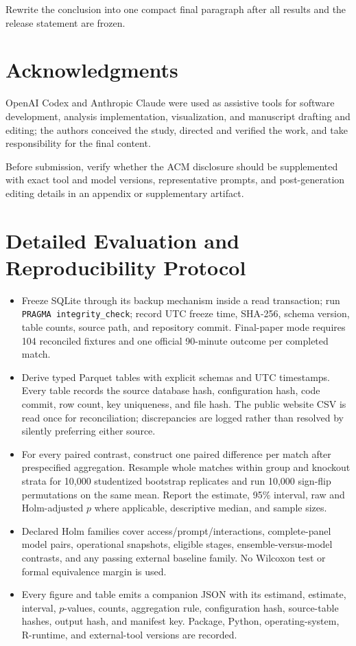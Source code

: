 \documentclass[sigconf,review]{acmart}
\newenvironment{draftbullets}
  {\begin{itemize}[leftmargin=1.25em,itemsep=1.5pt,topsep=2pt,parsep=0pt,partopsep=0pt]}
  {\end{itemize}}
\newcommand{\TODO}[1]{{\color{red}#1}}
\begin{document}
\TODO{Rewrite the conclusion into one compact final paragraph after all results and the release statement are frozen.}

\section*{Acknowledgments}

OpenAI Codex and Anthropic Claude were used as assistive tools for software development, analysis
implementation, visualization, and manuscript drafting and editing; the authors conceived the study,
directed and verified the work, and take responsibility for the final content.

\TODO{Before submission, verify whether the ACM disclosure should be supplemented with exact tool and model versions, representative prompts, and post-generation editing details in an appendix or supplementary artifact.}




\clearpage
\appendix

\section{Detailed Evaluation and Reproducibility Protocol}

\begin{draftbullets}
  \item Freeze SQLite through its backup mechanism inside a read transaction; run
  \texttt{PRAGMA integrity\_check}; record UTC freeze time, SHA-256, schema version, table counts,
  source path, and repository commit. Final-paper mode requires 104 reconciled fixtures and one
  official 90-minute outcome per completed match.
  \item Derive typed Parquet tables with explicit schemas and UTC timestamps. Every table records the
  source database hash, configuration hash, code commit, row count, key uniqueness, and file hash.
  The public website CSV is read once for reconciliation; discrepancies are logged rather than
  resolved by silently preferring either source.
  \item For every paired contrast, construct one paired difference per match after prespecified
  aggregation. Resample whole matches within group and knockout strata for 10,000 studentized
  bootstrap replicates and run 10,000 sign-flip permutations on the same mean. Report the estimate,
  95\% interval, raw and Holm-adjusted $p$ where applicable, descriptive median, and sample sizes.
  \item Declared Holm families cover access/prompt/interactions, complete-panel model pairs,
  operational snapshots, eligible stages, ensemble-versus-model contrasts, and any passing external
  baseline family. No Wilcoxon test or formal equivalence margin is used.
  \item Every figure and table emits a companion JSON with its estimand, estimate, interval,
  $p$-values, counts, aggregation rule, configuration hash, source-table hashes, output hash, and
  manifest key. Package, Python, operating-system, R-runtime, and external-tool versions are recorded.
\end{draftbullets}
\end{document}

